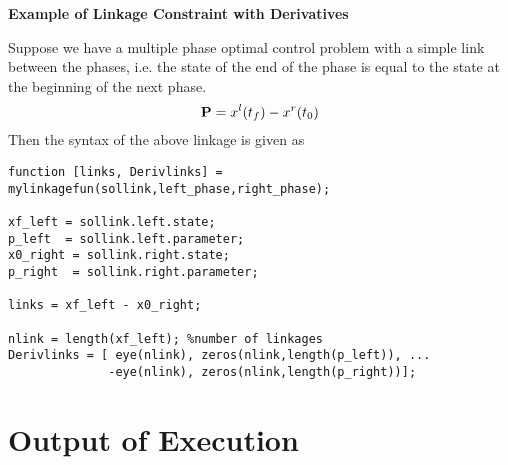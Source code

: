 \documentclass[10pt,final]{report}
\newenvironment{shadedframe}{%
  \def\FrameCommand{\fcolorbox{black}{shadecolor}}%
  \MakeFramed {\FrameRestore}}
{\endMakeFramed}
\begin{document}
\begin{shadedframe}
{\noindent}{\bf Example of Linkage Constraint with Derivatives}
\vspace{12pt}

{\noindent}Suppose we have a multiple phase optimal control problem with a simple link between the phases, i.e. the state of the end of the phase is equal to the state at the beginning of the next phase.  \begin{displaymath}
\mathbf{P} = x^l(t_f) - x^r(t_0)
\end{displaymath}
Then the syntax of the above linkage is given as
\begin{verbatim}
function [links, Derivlinks] = mylinkagefun(sollink,left_phase,right_phase);

xf_left = sollink.left.state;
p_left  = sollink.left.parameter;
x0_right = sollink.right.state;
p_right  = sollink.right.parameter;

links = xf_left - x0_right;

nlink = length(xf_left); %number of linkages
Derivlinks = [ eye(nlink), zeros(nlink,length(p_left)), ...
              -eye(nlink), zeros(nlink,length(p_right))];
\end{verbatim}
\end{shadedframe}


\section{Output of Execution\label{sect: output}}
\end{document}
